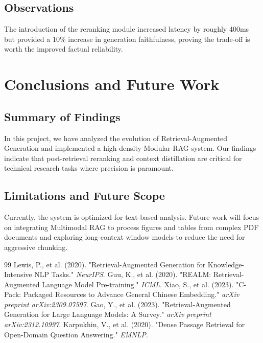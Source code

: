 \documentclass[11pt,a4paper,oneside]{report}
\begin{document}
\section{Observations}
The introduction of the reranking module increased latency by roughly 400ms but provided a 10\% increase in generation faithfulness, proving the trade-off is worth the improved factual reliability.

\chapter{Conclusions and Future Work}
\label{ch:conclusions}

\section{Summary of Findings}
In this project, we have analyzed the evolution of Retrieval-Augmented Generation and implemented a high-density Modular RAG system. Our findings indicate that post-retrieval reranking and context distillation are critical for technical research tasks where precision is paramount.

\section{Limitations and Future Scope}
Currently, the system is optimized for text-based analysis. Future work will focus on integrating Multimodal RAG to process figures and tables from complex PDF documents and exploring long-context window models to reduce the need for aggressive chunking.


\begin{thebibliography}{99}
 Lewis, P., et al. (2020). "Retrieval-Augmented Generation for Knowledge-Intensive NLP Tasks." \textit{NeurIPS}.
 Guu, K., et al. (2020). "REALM: Retrieval-Augmented Language Model Pre-training." \textit{ICML}.
 Xiao, S., et al. (2023). "C-Pack: Packaged Resources to Advance General Chinese Embedding." \textit{arXiv preprint arXiv:2309.07597}.
 Gao, Y., et al. (2023). "Retrieval-Augmented Generation for Large Language Models: A Survey." \textit{arXiv preprint arXiv:2312.10997}.
 Karpukhin, V., et al. (2020). "Dense Passage Retrieval for Open-Domain Question Answering." \textit{EMNLP}.
\end{thebibliography}
\end{document}
